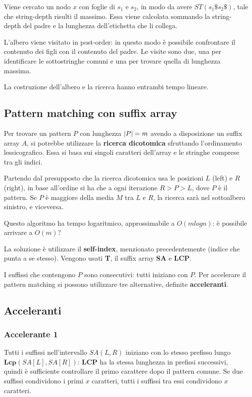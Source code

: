 Viene cercato un nodo $x$ con foglie di $s_1$ e $s_2$, in modo da avere $ST(s_1\$s_2\$)$, tale che string-depth risulti il massimo. Essa viene calcolata sommando la string-depth del padre e la lunghezza dell'etichetta che li collega.

L'albero viene visitato in post-order: in questo modo è possibile confrontare il contenuto dei figli con il contenuto del padre. Le visite sono due, una per identificare le sottostringhe comuni e una per trovare quella di lunghezza massima.

La costruzione dell'albero e la ricerca hanno entrambi tempo lineare.

\subsection{Pattern matching con suffix array} 
Per trovare un pattern $P$ con lunghezza $\left|P\right| = m$ avendo a disposizione un suffix array $A$, si potrebbe utilizzare la \textbf{ricerca dicotomica} sfruttando l'ordinamento lessicografico. Essa si basa sui singoli caratteri dell'array e le stringhe comprese tra gli indici.

Partendo dal presupposto che la ricerca dicotomica usa le posizioni $L$ (left) e $R$ (right), in base all'ordine si ha che a ogni iterazione $R > P > L$, dove $P$ è il pattern. Se $P$ è maggiore della media $M$ tra $L$ e $R$, la ricerca sarà nel sottoalbero sinistro, e viceversa.

Questo algoritmo ha tempo logaritmico, approssimabile a $O(mlogn)$: è possibile arrivare a $O(m)$?

La soluzione è utilizzare il \textbf{self-index}, menzionato precedentemente (indice che punta a se stesso). Vengono usati \textbf{T}, il suffix array \textbf{SA} e \textbf{LCP}.

I suffissi che contengono $P$ sono consecutivi: tutti iniziano con $P$. Per accelerare il pattern matching si possono utilizzare tre alternative, definite \textbf{acceleranti}.

\subsection{Acceleranti}
\subsubsection{Accelerante 1} \label{accelerante-1}
Tutti i suffissi nell'intervallo $SA(L, R)$ iniziano con lo stesso prefisso lungo $\textbf{Lcp}(SA[L], SA[R])$: \textbf{LCP} ha la stessa lunghezza in prefissi successivi, quindi è sufficiente controllare il primo carattere dopo il pattern comune. Se due suffissi condividono i primi $x$ caratteri, tutti i suffissi tra essi condividono $x$ caratteri.

